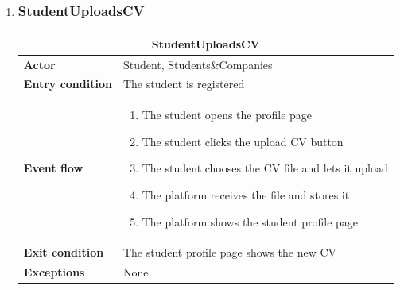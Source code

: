 \begin{enumerate}[label=\textbf{UC\arabic* -}]
\item \subsubsection{StudentUploadsCV}

\begin{table}[H]
    \centering
    \begin{tabular}{|l|m{10cm}|}
        \hline \multicolumn{2}{|c|}{\textbf{StudentUploadsCV}} \\
        \hline \textbf{Actor} & Student, Students\&Companies \\
        \hline \textbf{Entry condition} & The student is registered \\
        \hline \textbf{Event flow} &
            \begin{enumerate}[label=\arabic*]
                \item The student opens the profile page
                \item The student clicks the upload CV button
                \item The student chooses the CV file and lets it upload
                \item The platform receives the file and stores it
                \item The platform shows the student profile page
            \end{enumerate} \\
        \hline \textbf{Exit condition} & The student profile page shows the new CV \\
        \hline \textbf{Exceptions} & None \\
        \hline
    \end{tabular}
\end{table}

\begin{figure}[H]
    \centering
\end{figure}


\end{enumerate}
